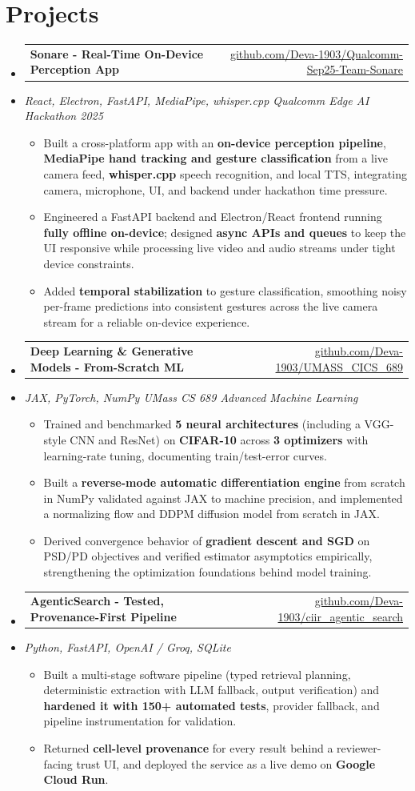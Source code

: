 \documentclass[letterpaper,10pt]{article}
\makeatletter
\newcommand{\resumeItem}[1]{
  \item\small{#1\vspace{-1pt}}
}
\newcommand{\resumeProjectHeading}[2]{
    \item
    \begin{tabular*}{0.985\textwidth}[t]{l@{\extracolsep{\fill}}r}
      \small\textbf{#1} & \small #2 \\
    \end{tabular*}\vspace{-5pt}
}
\newcommand{\resumeProjectSubheading}[1]{
  \vspace{-2pt}\item[] {\small\textcolor{ResumeSlate}{\emph{#1}}}\vspace{-3pt}
}
\newcommand{\resumeSubHeadingListStart}{\begin{itemize}[leftmargin=0.0in, label={}, itemsep=2pt, topsep=2pt]}
\newcommand{\resumeSubHeadingListEnd}{\end{itemize}}
\newcommand{\resumeItemListStart}{\begin{itemize}[leftmargin=0.18in, itemsep=2pt, topsep=1pt]}
\newcommand{\resumeItemListEnd}{\end{itemize}\vspace{-4pt}}
\makeatother
\begin{document}
\section{Projects}
\resumeSubHeadingListStart
  \resumeProjectHeading
    {Sonare - Real-Time On-Device Perception App}
    {\href{https://github.com/Deva-1903/Qualcomm-Sep25-Team-Sonare}{github.com/Deva-1903/Qualcomm-Sep25-Team-Sonare}}
  \resumeProjectSubheading{React, Electron, FastAPI, MediaPipe, whisper.cpp \enspace\textbar\enspace Qualcomm Edge AI Hackathon 2025}
    \resumeItemListStart
      \resumeItem{Built a cross-platform app with an \textbf{on-device perception pipeline}, \textbf{MediaPipe hand tracking and gesture classification} from a live camera feed, \textbf{whisper.cpp} speech recognition, and local TTS, integrating camera, microphone, UI, and backend under hackathon time pressure.}
      \resumeItem{Engineered a FastAPI backend and Electron/React frontend running \textbf{fully offline on-device}; designed \textbf{async APIs and queues} to keep the UI responsive while processing live video and audio streams under tight device constraints.}
      \resumeItem{Added \textbf{temporal stabilization} to gesture classification, smoothing noisy per-frame predictions into consistent gestures across the live camera stream for a reliable on-device experience.}
    \resumeItemListEnd
  \resumeProjectHeading
    {Deep Learning \& Generative Models - From-Scratch ML}
    {\href{https://github.com/Deva-1903/UMASS_CICS_689}{github.com/Deva-1903/UMASS\_CICS\_689}}
  \resumeProjectSubheading{JAX, PyTorch, NumPy \enspace\textbar\enspace UMass CS 689 Advanced Machine Learning}
    \resumeItemListStart
      \resumeItem{Trained and benchmarked \textbf{5 neural architectures} (including a VGG-style CNN and ResNet) on \textbf{CIFAR-10} across \textbf{3 optimizers} with learning-rate tuning, documenting train/test-error curves.}
      \resumeItem{Built a \textbf{reverse-mode automatic differentiation engine} from scratch in NumPy validated against JAX to machine precision, and implemented a normalizing flow and DDPM diffusion model from scratch in JAX.}
      \resumeItem{Derived convergence behavior of \textbf{gradient descent and SGD} on PSD/PD objectives and verified estimator asymptotics empirically, strengthening the optimization foundations behind model training.}
    \resumeItemListEnd
  \resumeProjectHeading
    {AgenticSearch - Tested, Provenance-First Pipeline}
    {\href{https://github.com/Deva-1903/ciir_agentic_search}{github.com/Deva-1903/ciir\_agentic\_search}}
  \resumeProjectSubheading{Python, FastAPI, OpenAI / Groq, SQLite}
    \resumeItemListStart
      \resumeItem{Built a multi-stage software pipeline (typed retrieval planning, deterministic extraction with LLM fallback, output verification) and \textbf{hardened it with 150+ automated tests}, provider fallback, and pipeline instrumentation for validation.}
      \resumeItem{Returned \textbf{cell-level provenance} for every result behind a reviewer-facing trust UI, and deployed the service as a live demo on \textbf{Google Cloud Run}.}
    \resumeItemListEnd
\resumeSubHeadingListEnd
\vspace{-4pt}
\end{document}

